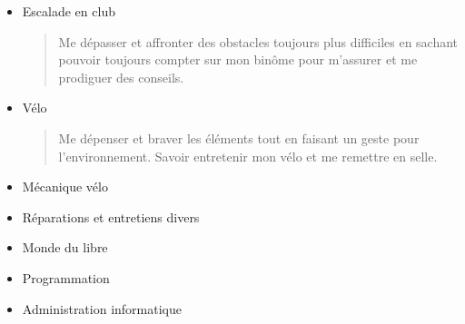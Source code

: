 \documentclass[10pt,a4paper,ragged2e,withhyper,normalphoto]{altacv}
\begin{document}
\begin{paracol}{2}
\begin{itemize}
	\item[\faAngleDoubleUp] Escalade en club\par%
	\begin{quote}
		Me dépasser et affronter des obstacles toujours plus difficiles en sachant pouvoir toujours compter sur mon binôme pour m'assurer et me prodiguer des conseils.
	\end{quote}
	\item[\faBiking] Vélo\par%
	\begin{quote}
		Me dépenser et braver les éléments tout en faisant un geste pour l'environnement. Savoir entretenir mon vélo et me remettre en selle.
	\end{quote}
\end{itemize}
	
\begin{itemize}
	\item Mécanique vélo
	\item Réparations et entretiens divers
\end{itemize}

\begin{itemize}
	\item Monde du libre
	\item Programmation
	\item Administration informatique
\end{itemize}
	
\newpage

\end{paracol}
\end{document}

